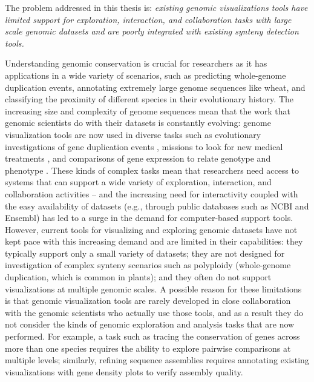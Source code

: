 The problem addressed in this thesis is: \textit{existing genomic visualizations tools have limited support for exploration, interaction, and collaboration tasks with large scale genomic datasets and are poorly integrated with existing synteny detection tools.}

Understanding genomic conservation is crucial for researchers as it has applications in a wide variety of scenarios, such as predicting whole-genome duplication events, annotating extremely large genome sequences like wheat, and classifying the proximity of different species in their evolutionary history. The increasing size and complexity of genome sequences mean that the work that genomic scientists do with their datasets is constantly evolving: genome visualization tools are now used in diverse tasks such as evolutionary investigations of gene duplication events \cite{rubin2000comparative}, missions to look for new medical treatments \cite{collins2003vision}, and comparisons of gene expression to relate genotype and phenotype \cite{hanada2008importance}. These kinds of complex tasks mean that researchers need access to systems that can support a wide variety of exploration, interaction, and collaboration activities -- and the increasing need for interactivity coupled with the easy availability of datasets (e.g., through public databases such as NCBI and Ensembl) has led to a surge in the demand for computer-based support tools. However, current tools for visualizing and exploring genomic datasets have not kept pace with this increasing demand and are limited in their capabilities: they typically support only a small variety of datasets; they are not designed for investigation of complex synteny scenarios such as polyploidy (whole-genome duplication, which is common in plants); and they often do not support visualizations at multiple genomic scales. A possible reason for these limitations is that genomic visualization tools are rarely developed in close collaboration with the genomic scientists who actually use those tools, and as a result they do not consider the kinds of genomic exploration and analysis tasks that are now performed. For example, a task such as tracing the conservation of genes across more than one species requires the ability to explore pairwise comparisons at multiple levels; similarly, refining sequence assemblies requires annotating existing visualizations with gene density plots to verify assembly quality. 




